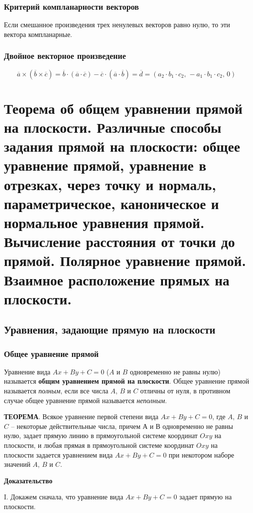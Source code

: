 \documentclass{article}
\begin{document}
\subsubsection{Критерий компланарности векторов}
Если смешанное произведения трех ненулевых векторов равно нулю, то эти вектора компланарные.
\subsubsection{Двойное векторное произведение}
$$ \overline{a}\times(\overline{b}\times\overline{c})=\overline{b}\cdot(\overline{a}\cdot\overline{c})-\overline{c}\cdot(\overline{a}\cdot\overline{b}) = \overline{d}=(a_2\cdot b_1\cdot c_2,\,-a_1\cdot b_1\cdot c_2,\, 0) $$

\newpage
\section{Теорема об общем уравнении прямой на плоскости. Различные способы задания прямой на плоскости: общее уравнение прямой, уравнение в отрезках, через точку и нормаль, параметрическое, каноническое и нормальное уравнения прямой. Вычисление расстояния от точки до прямой. Полярное уравнение прямой. Взаимное расположение прямых на плоскости.}
\subsection{Уравнения, задающие прямую на плоскости}
\subsubsection{Общее уравнение прямой}
Уравнение вида $Ax + By + C = 0$ ($A$ и $B$ одновременно не равны нулю) называется \textbf{общим уравнением прямой на плоскости}. Общее уравнение прямой называется \textit{полным}, если все числа $A$, $B$ и $C$ отличны от нуля, в противном случае общее уравнение прямой называется \textit{неполным}.

\textbf{ТЕОРЕМА}. Всякое уравнение первой степени вида $Ax+By+C=0$, где $A$, $B$ и $C$ – некоторые действительные числа, причем А и В одновременно не равны нулю, задает прямую линию в прямоугольной системе координат $Oxy$ на плоскости, и любая прямая в прямоугольной системе координат $Oxy$ на плоскости задается уравнением вида $Ax+By+C=0$ при некотором наборе значений $A$, $B$ и $C$.

\textbf{Доказательство}

I. Докажем сначала, что уравнение вида $Ax+By+C=0$ задает прямую на плоскости.
\end{document}
